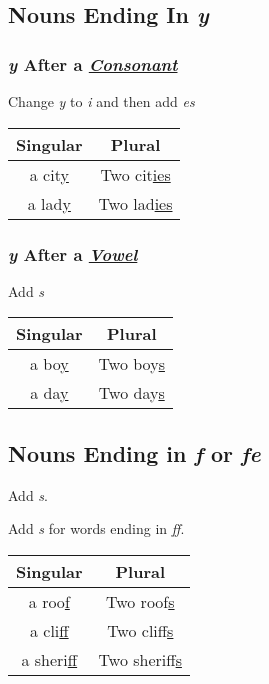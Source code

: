 \documentclass{elegantbook}
\begin{document}
    \subsection{Nouns Ending In \emph{y}}
    \subsubsection{\emph{y} After a \emph{\underline{Consonant}}}
    \begin{property}
        Change \emph{y} to \emph{i} and then add \emph{es}
    \end{property}
    \begin{center}
        \begin{tabular}{c|c}
            \textbf{Singular}&\textbf{Plural}\\
            \hline
            a cit\underline{y}&Two cit\underline{ies}\\
            a lad\underline{y}&Two lad\underline{ies}\\
        \end{tabular}
    \end{center}
    \subsubsection{\emph{y} After a \emph{\underline{Vowel}}}
    \begin{property}
        Add \emph{s}
    \end{property}
    \begin{center}
        \begin{tabular}{c|c}
            \textbf{Singular}&\textbf{Plural}\\
            \hline
            a bo\underline{y}&Two boy\underline{s}\\
            a da\underline{y}&Two day\underline{s}\\
        \end{tabular}
    \end{center}
    \subsection{Nouns Ending in \emph{f} or \emph{fe}}
    \begin{property}
        Add \emph{s}.
    \end{property}
    \begin{property}
        Add \emph{s} for words ending in \emph{ff}.
    \end{property}
    \begin{center}
        \begin{tabular}{c|c}
            \textbf{Singular}&\textbf{Plural}\\
            \hline
            a roo\underline{f}&Two roof\underline{s}\\
            a cli\underline{ff}&Two cliff\underline{s}\\
            a sheri\underline{ff}&Two sheriff\underline{s}\\
        \end{tabular}
    \end{center}
\end{document}
